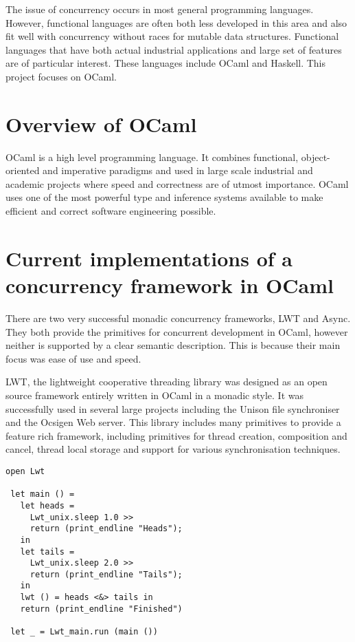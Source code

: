 \documentclass[12pt,twoside,notitlepage]{report}
\begin{document}
The issue of concurrency occurs in most general programming languages. However, functional languages are often both less developed in this area and also fit well with concurrency without races for mutable data structures. Functional languages that have both actual industrial applications and large set of features are of particular interest. These languages include OCaml and Haskell. This project focuses on OCaml. 

\section{Overview of OCaml}
OCaml is a high level programming language. It combines functional, object-oriented and imperative paradigms and used in large scale industrial and academic projects where speed and correctness are of utmost importance. OCaml uses one of the most powerful type and inference systems available to make efficient and correct software engineering possible.
  

\section{Current implementations of a concurrency framework in OCaml}
There are two very successful monadic concurrency frameworks, LWT\cite{LWT} and Async\cite{Async}. They both provide the primitives for concurrent development in OCaml, however neither is supported by a clear semantic description.  This is because their main focus was ease of use and speed. 

LWT, the lightweight cooperative threading library\cite{vouillon2008lwt} was designed as an open source framework entirely written in OCaml in a monadic style. It was successfully used in several large projects including the Unison file synchroniser and the Ocsigen Web server. This library includes many primitives to provide a feature rich framework, including primitives for thread creation, composition and cancel, thread local storage and support for various synchronisation techniques. 

\begin{minipage}{\linewidth}
\begin{lstlisting}[caption={LWT example}]
 open Lwt
 
 let main () =
   let heads =
     Lwt_unix.sleep 1.0 >>
     return (print_endline "Heads");
   in
   let tails =
     Lwt_unix.sleep 2.0 >>
     return (print_endline "Tails");
   in
   lwt () = heads <&> tails in
   return (print_endline "Finished")
 
 let _ = Lwt_main.run (main ())
\end{lstlisting}
\end{minipage}
\end{document}
